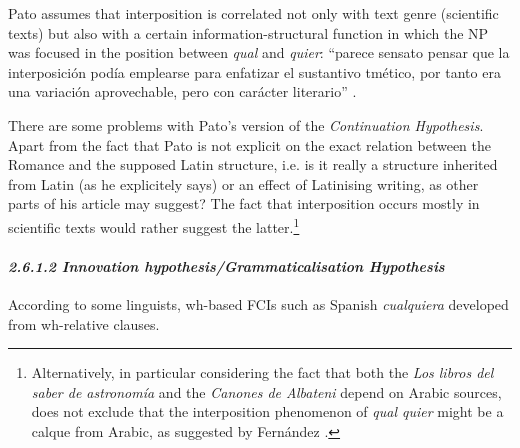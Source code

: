 \documentclass[output=paper]{langscibook}
\begin{document}
Pato assumes that interposition is correlated not only with text genre (scientific texts) but also with a certain information-structural function in which the NP was focused in the position between \textit{qual} and \textit{quier}: “parece sensato pensar que la interposición podía emplearse para enfatizar el sustantivo tmético, por tanto era una variación aprovechable, pero con carácter literario” \citep[284]{Pato2012}.

  There are some problems with Pato’s version of the \textit{Continuation Hypothesis}. Apart from the fact that Pato is not explicit on the exact relation between the Romance and the supposed Latin structure, i.e. is it really a structure inherited from Latin (as he explicitely says) or an effect of Latinising writing, as other parts of his article may suggest? The fact that interposition occurs mostly in scientific texts would rather suggest the latter.\footnote{Alternatively, in particular considering the fact that both the \textrm{\textit{Los libros del saber de astronomía}} \textrm{and the} \textrm{\textit{Canones de Albateni}} \textrm{depend on Arabic sources, \citet[306]{Pato2012} does not exclude that the interposition phenomenon of} \textrm{\textit{qual quier}} \textrm{might be a calque from Arabic, as suggested by Fernández \citet{González1992}.}} 

\paragraph{\textit{2.6.1.2 Innovation hypothesis/Grammaticalisation Hypothesis}}

  According to some linguists, wh-based FCIs such as Spanish \textit{cualquiera} developed from wh-relative clauses. 
\end{document}

